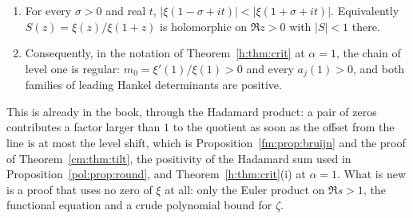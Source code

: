 \begin{proposition}\label{qt:prop:levelone}
\begin{enumerate}
\item For every $\sigma>0$ and real $t$, $|\xi(1-\sigma+it)|<|\xi(1+\sigma+it)|$. Equivalently $S(z)=\xi(z)/\xi(1+z)$ is holomorphic on $\Re z>0$ with $|S|<1$ there.
\item Consequently, in the notation of Theorem~\ref{h:thm:crit} at $\alpha=1$, the chain of level one is regular: $m_0=\xi'(1)/\xi(1)>0$ and every $a_j(1)>0$, and both families of leading Hankel determinants are positive.
\end{enumerate}
\end{proposition}

This is already in the book, through the Hadamard product: a pair of zeros contributes a factor larger than $1$ to the quotient as soon as the offset from the line is at most the level shift, which is Proposition~\ref{fm:prop:bruijn} and the proof of Theorem~\ref{cm:thm:tilt}, the positivity of the Hadamard sum used in Proposition~\ref{pol:prop:round}, and Theorem~\ref{h:thm:crit}(i) at $\alpha=1$. What is new is a proof that uses no zero of $\xi$ at all: only the Euler product on $\Re s>1$, the functional equation and a crude polynomial bound for $\zeta$.

